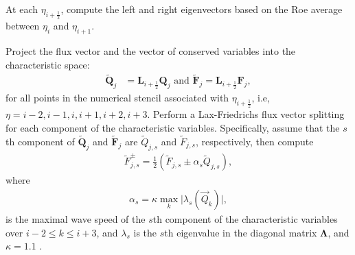 At each $\eta_{i+\frac{1}{2}}$, compute the left and right eigenvectors based on the Roe average between $\eta_i$ and $\eta_{i+1}$.

Project the flux vector and the vector of conserved variables into the characteristic space\+: \[ \begin{align*} \tilde{\mathbf{Q}}_{j} &= \mathbf{L}_{i+\frac{1}{2}}\mathbf{Q}_{j} \text{{} and }\tilde{\mathbf{F}}_{j} = \mathbf{L}_{i+\frac{1}{2}}\mathbf{F}_{j}, \end{align*} \] for all points in the numerical stencil associated with $\eta_{i+\frac{1}{2}}$, i.\+e, $\eta = i-2, i-1, i, i+1, i+2, i+3$.  Perform a Lax-\/\+Friedrichs flux vector splitting for each component of the characteristic variables. Specifically, assume that the $s$th component of $\tilde{\mathbf{Q}}_{j}$ and $\tilde{\mathbf{F}}_{j}$ are $\tilde{Q}_{j,s}$ and $\tilde{F}_{j,s}$, respectively, then compute \[ \begin{align*} \tilde{F}_{j,s}^{\pm} =\frac{1}{2}(\tilde{F}_{j,s}\pm\alpha_{s}\tilde{Q}_{j,s}), \end{align*} \] where \[ \begin{align*}\label{eq:alpha} \alpha_{s} = \kappa \underset{k}\max \lvert \lambda_{s}(\vec{Q}_{k})\rvert, \end{align*} \] is the maximal wave speed of the $s$th component of the characteristic variables over $i-2 \le k \le i+3$, and $\lambda_{s}$ is the $s$th eigenvalue in the diagonal matrix $\mathbf{\Lambda}$, and $\kappa=1.1$ \cite{Jiang1996:fifth}.

